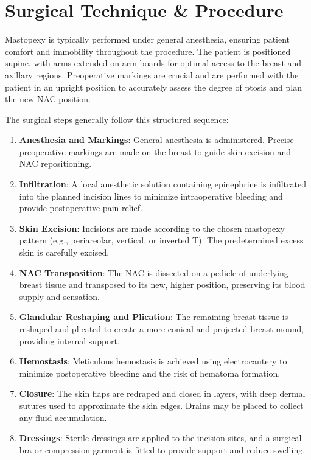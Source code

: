 \section*{Surgical Technique \& Procedure}
Mastopexy is typically performed under general anesthesia, ensuring patient comfort and immobility throughout the procedure. The patient is positioned supine, with arms extended on arm boards for optimal access to the breast and axillary regions. Preoperative markings are crucial and are performed with the patient in an upright position to accurately assess the degree of ptosis and plan the new NAC position.

The surgical steps generally follow this structured sequence:

\begin{enumerate}
  \item \textbf{Anesthesia and Markings}: General anesthesia is administered. Precise preoperative markings are made on the breast to guide skin excision and NAC repositioning.
  
  \item \textbf{Infiltration}: A local anesthetic solution containing epinephrine is infiltrated into the planned incision lines to minimize intraoperative bleeding and provide postoperative pain relief.
  
  \item \textbf{Skin Excision}: Incisions are made according to the chosen mastopexy pattern (e.g., periareolar, vertical, or inverted T). The predetermined excess skin is carefully excised.
  
  \item \textbf{NAC Transposition}: The NAC is dissected on a pedicle of underlying breast tissue and transposed to its new, higher position, preserving its blood supply and sensation.
  
  \item \textbf{Glandular Reshaping and Plication}: The remaining breast tissue is reshaped and plicated to create a more conical and projected breast mound, providing internal support.
  
  \item \textbf{Hemostasis}: Meticulous hemostasis is achieved using electrocautery to minimize postoperative bleeding and the risk of hematoma formation.
  
  \item \textbf{Closure}: The skin flaps are redraped and closed in layers, with deep dermal sutures used to approximate the skin edges. Drains may be placed to collect any fluid accumulation.
  
  \item \textbf{Dressings}: Sterile dressings are applied to the incision sites, and a surgical bra or compression garment is fitted to provide support and reduce swelling.
\end{enumerate}

